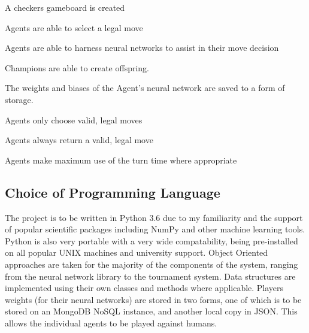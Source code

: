 \documentclass[12pt,a4paper]{article}
\begin{document}
A checkers gameboard is created

Agents are able to select a legal move

Agents are able to harness neural networks to assist in their move decision

Champions are able to create offspring.

The weights and biases of the Agent's neural network are saved to a form of storage.

Agents only choose valid, legal moves

Agents always return a valid, legal move

Agents make maximum use of the turn time where appropriate
\blindtext

\subsection*{Choice of Programming Language}

The project is to be written in Python 3.6 due to my familiarity and the support of popular scientific packages including NumPy and other machine learning tools. Python is also very portable with a very wide compatability, being pre-installed on all popular UNIX machines and university support. 
Object Oriented approaches are taken for the majority of the components of the system, ranging from the neural network library to the tournament system. Data structures are implemented using their own classes and methods where applicable. 
Players weights (for their neural networks) are stored in two forms, one of which is to be stored on an MongoDB NoSQL instance, and another local copy in JSON. This allows the individual agents to be played against humans.
\end{document}
